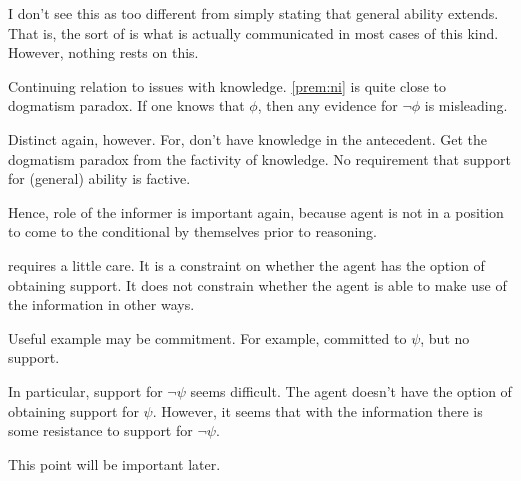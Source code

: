 \begin{note}[Aside]
  I don't see this as too different from simply stating that general ability extends.
  That is, the sort of \gsi{} is what is actually communicated in most cases of this kind.
  However, nothing rests on this.
\end{note}

\begin{note}[Dogmatism]
  Continuing relation to issues with knowledge.
  \autoref{prem:ni} is quite close to dogmatism paradox.
  If one knows that \(\phi\), then any evidence for \(\lnot \phi\) is misleading.

  Distinct again, however.
  For, don't have knowledge in the antecedent.
  Get the dogmatism paradox from the factivity of knowledge.
  No requirement that support for (general) ability is factive.

  Hence, role of the informer is important again, because agent is not in a position to come to the conditional by themselves prior to reasoning.
\end{note}


\begin{note}
  \nI{} requires a little care.
  It is a constraint on whether the agent has the option of obtaining support.
  It does not constrain whether the agent is able to make use of the information in other ways.

  Useful example may be commitment.
  For example, committed to \(\psi\), but no support.

  In particular, support for \(\lnot\psi\) seems difficult.
  The agent doesn't have the option of obtaining support for \(\psi\).
  However, it seems that with the information there is some resistance to support for \(\lnot\psi\).

  This point will be important later.
\end{note}

